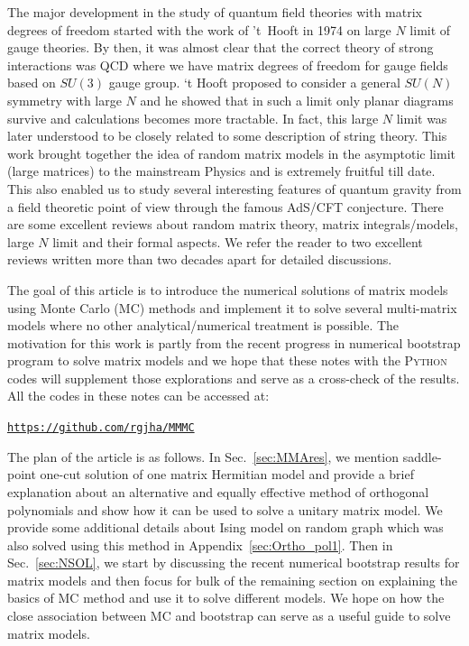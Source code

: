 \documentclass[11pt]{article}
\newcommand{\PY}{\textsc{Python}}
\begin{document}
The major development in the study of quantum field theories with matrix degrees of freedom
started with the work of 't~Hooft in 1974 on large $N$ limit of gauge theories. 
By then, it was almost clear that the correct theory of 
strong interactions was QCD where we have matrix degrees of freedom for gauge fields
based on $SU(3)$ gauge group. `t Hooft proposed to consider a general $SU(N)$ 
symmetry with large $N$ and he showed that in such a limit only planar diagrams 
survive and calculations becomes more tractable. In fact, this large $N$ limit was later 
understood to be closely related to some description of string theory. This work brought together the idea of random matrix models
in the asymptotic limit (large matrices) to the mainstream Physics and is extremely fruitful till date. 
This also enabled us to study several interesting features of quantum gravity 
from a field theoretic point of view through the famous AdS/CFT conjecture.
There are some excellent reviews about random matrix theory, matrix integrals/models, large $N$ limit 
and their formal aspects. We refer the reader to two excellent reviews written more than two decades 
apart \cite{DiFrancesco:1993cyw,Eynard:2015aea} for detailed discussions. 

The goal of this article is to introduce the numerical solutions of matrix models using 
Monte Carlo (MC) methods and implement it to solve several multi-matrix 
models where no other analytical/numerical treatment is possible. 
The motivation for this work is partly from the recent progress in numerical bootstrap program to 
solve matrix models and we hope that these notes with the \PY~ codes will supplement
those explorations and serve as a cross-check of the results. All the codes in these notes can be accessed at:  
\begin{center} \texttt{\href{https://github.com/rgjha/MMMC}{https://github.com/rgjha/MMMC}} \end{center}
The plan of the article is as follows. In Sec.~\ref{sec:MMAres}, we mention saddle-point one-cut solution 
of one matrix Hermitian model and provide a brief explanation about an alternative and equally effective
method of orthogonal polynomials and show how it can be used to 
solve a unitary matrix model. We provide some additional details about Ising model on random graph 
which was also solved using this method in Appendix~\ref{sec:Ortho_pol1}. 
Then in Sec.~\ref{sec:NSOL}, we start by discussing the recent 
numerical bootstrap results for matrix models and then focus for bulk of the 
remaining section on explaining the basics of MC method and use it to solve different models. 
We hope on how the close association between MC 
and bootstrap can serve as a useful guide to solve matrix models. 
\end{document}
